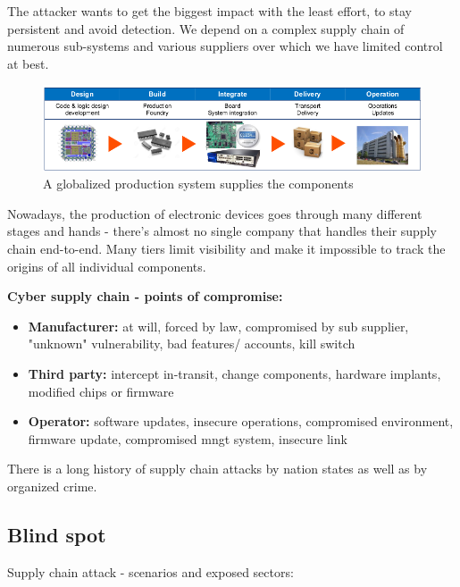 \documentclass[11pt,oneside,a4paper]{article}
\begin{document}
The attacker wants to get the biggest impact with the least effort, to stay persistent and avoid detection. We depend on a complex supply chain of numerous sub-systems and various suppliers over which we have limited control at best.

\begin{figure}[hb]
	\centering
	\includegraphics[width=0.7\linewidth]{figures/supply_chain}
	\caption{A globalized production system supplies the components}
	\label{fig:supplychain}
\end{figure}

\noindent Nowadays, the production of electronic devices goes through many different stages and hands - there's almost no single company that handles their supply chain end-to-end. Many tiers limit visibility and make it impossible to track the origins of all individual components.

\noindent \textbf{Cyber supply chain - points of compromise:}

\vspace{-\topsep}
\begin{itemize}
	\setlength{\itemsep}{0pt}
	\setlength{\parskip}{0pt}
	\item \textbf{Manufacturer:} at will, forced by law, compromised by sub supplier, "unknown" vulnerability, bad features/ accounts, kill switch
	\item \textbf{Third party:} intercept in-transit, change components, hardware implants, modified chips or firmware
	\item \textbf{Operator:} software updates, insecure operations, compromised environment, firmware update, compromised mngt system, insecure link
\end{itemize}
\vspace{-\topsep}

\noindent There is a long history of supply chain attacks by nation states as well as by organized crime.

\subsection{Blind spot}

Supply chain attack - scenarios and exposed sectors:
\end{document}
